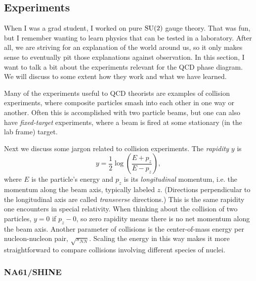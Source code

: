 
\subsection{Experiments}

When I was a grad student, I worked on pure $\operatorname{SU}(2)$ gauge theory. That was fun,
but I remember wanting to learn physics that can be tested in a laboratory.
After all, we are striving for an explanation of the world around us, so it only
makes sense to eventually pit those explanations against observation. In this
section, I want to talk a bit about the experiments relevant for the QCD phase
diagram. We will discuss to some extent how they work and what we have learned.

Many of the experiments useful to QCD theorists are examples of collision
experiments, where composite particles smash into each other in one way or
another. Often this is accomplished with two particle beams, but one can also
have {\it fixed-target} experiments, where a beam
is fired at some stationary (in the lab frame) target. 

Next we discuss some jargon related to collision experiments. The {\it
rapidity} $y$ is
\begin{equation}
y = \frac{1}{2} \log\left(\frac{E + p_z}{E - p_z}\right),
\end{equation}
where $E$ is the particle's energy and $p_z$ is its {\it longitudinal} momentum,
i.e. the momentum along the beam axis, typically labeled $z$.
(Directions perpendicular to the longitudinal axis are
called {\it transverse} directions.) This is the same rapidity
one encounters in special relativity. When thinking about the collision of two
particles, $y=0$ if $p_z-0$, so zero rapidity means there is no net momentum
along the beam axis. Another parameter of collisions is the center-of-mass
energy per nucleon-nucleon pair, $\sqrt{s_{NN}}$. Scaling the energy in this way
makes it more straightforward to compare collisions involving different species
of nuclei. 


\subsubsection{NA61/SHINE}


